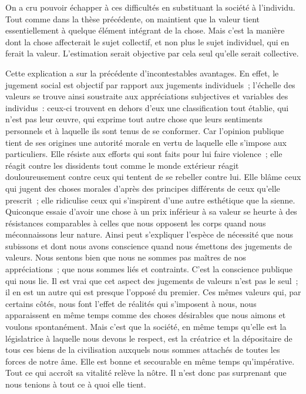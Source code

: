 \documentclass[french,twoside]{book} %
\begin{document}
On a cru pouvoir échapper à ces difficultés en substituant la société à l’individu. Tout comme dans la thèse précédente, on maintient que la valeur tient essentiellement à quelque élément intégrant de la chose. Mais c’est la manière dont la chose affecterait le sujet collectif, et non plus le sujet individuel, qui en ferait la valeur. L’estimation serait objective par cela seul qu’elle serait collective.\par
Cette explication a sur la précédente d’incontestables avantages. En effet, le jugement social est objectif par rapport aux jugements individuels ; l’échelle des valeurs se trouve ainsi soustraite aux appréciations subjectives et variables des individus : ceux-ci trouvent en dehors d’eux une classification tout établie, qui n’est pas leur œuvre, qui exprime tout autre chose que leurs sentiments personnels et à laquelle ils sont tenus de se conformer. Car l’opinion publique tient de ses origines une autorité morale en vertu de laquelle elle s’impose aux particuliers. Elle résiste aux efforts qui sont faits pour lui faire violence ; elle réagit contre les dissidents tout comme le monde extérieur réagit douloureusement contre ceux qui tentent de se rebeller contre lui. Elle blâme ceux qui jugent des choses morales d’après des principes différents de ceux qu’elle prescrit ; elle ridiculise ceux qui s’inspirent d’une autre esthétique que la sienne. Quiconque essaie d’avoir une chose à un prix inférieur à sa valeur se heurte à des résistances comparables à celles que nous opposent les corps quand nous méconnaissons leur nature. Ainsi peut s’expliquer l’espèce de nécessité que nous subissons et dont nous avons conscience quand nous émettons des jugements de valeurs. Nous sentons bien que nous ne sommes pas maîtres de nos appréciations ; que nous sommes liés et contraints. C’est la conscience publique qui nous lie. Il est vrai que cet aspect des jugements de valeurs n’est pas le seul ; il en est un autre qui est presque l’opposé du premier. Ces mêmes valeurs qui, par certains côtés, nous font l’effet de réalités qui s’imposent à nous, nous apparaissent en même temps comme des choses désirables que nous aimons et voulons spontanément. Mais c’est que la société, en même temps qu’elle est la législatrice à laquelle nous devons le respect, est la créatrice et la dépositaire de tous ces biens de la civilisation auxquels nous sommes attachés de toutes les forces de notre âme. Elle est bonne et secourable en même temps qu’impérative. Tout ce qui accroît sa vitalité relève la nôtre. Il n’est donc pas surprenant que nous tenions à tout ce à quoi elle tient.\par
\end{document}
